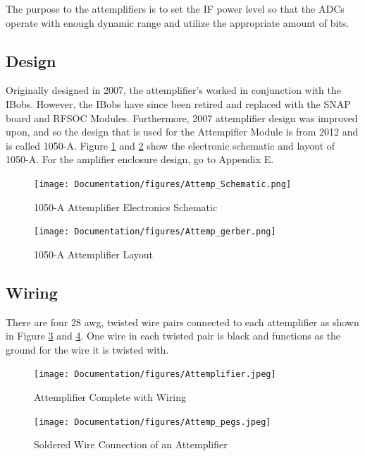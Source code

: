 \documentclass[12pt,a4paper,oneside]{article}
\begin{document}
The purpose to the attemplifiers is to set the IF power level so that the ADCs operate with enough dynamic range and utilize the appropriate amount of bits.

\subsection{Design}
\label{sec:4.1}

Originally designed in 2007, the attemplifier's worked in conjunction with the IBobs. However, the IBobs have since been retired and replaced with the SNAP board and RFSOC Modules. Furthermore, 2007 attemplifier design was improved upon, and so the design that is used for the Attempifier Module is from 2012 and is called 1050-A. Figure \ref{fig:Attemp_Schem} and \ref{fig:Attemp_layout} show the electronic schematic and layout of 1050-A. For the amplifier enclosure design, go to Appendix E.

%
\begin{figure}[H]
\centering
\texttt{[image: Documentation/figures/Attemp\_Schematic.png]}
\caption{1050-A Attemplifier Electronics Schematic}
\label{fig:Attemp_Schem}
\end{figure}
%

%
\begin{figure}[H]
\centering
\texttt{[image: Documentation/figures/Attemp\_gerber.png]}
\caption{1050-A Attemplifier Layout}
\label{fig:Attemp_layout}
\end{figure}
%


\subsection{Wiring}
\label{sec:4.2}

There are four 28 awg, twisted wire pairs connected to each attemplifier as shown in Figure \ref{fig:Attemplifier} and \ref{fig:Attemp_pegs}. One wire in each twisted pair is black and functions as the ground for the wire it is twisted with. 

%
\begin{figure}[H]
\centering
\texttt{[image: Documentation/figures/Attemplifier.jpeg]}
\caption{Attemplifier Complete with Wiring }
\label{fig:Attemplifier}
\end{figure}
%

%
\begin{figure}[H]
\centering
\texttt{[image: Documentation/figures/Attemp\_pegs.jpeg]}
\caption{Soldered Wire Connection of an Attemplifier}
\label{fig:Attemp_pegs}
\end{figure}
%
\end{document}
